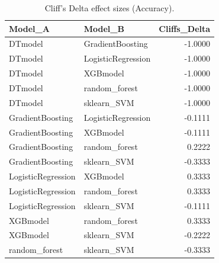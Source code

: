\begin{table}[t]
\centering
\begin{tabular}{llr}
\toprule
Model_A & Model_B & Cliffs_Delta \\
\midrule
DTmodel & GradientBoosting & -1.0000 \\
DTmodel & LogisticRegression & -1.0000 \\
DTmodel & XGBmodel & -1.0000 \\
DTmodel & random_forest & -1.0000 \\
DTmodel & sklearn_SVM & -1.0000 \\
GradientBoosting & LogisticRegression & -0.1111 \\
GradientBoosting & XGBmodel & -0.1111 \\
GradientBoosting & random_forest & 0.2222 \\
GradientBoosting & sklearn_SVM & -0.3333 \\
LogisticRegression & XGBmodel & 0.3333 \\
LogisticRegression & random_forest & 0.3333 \\
LogisticRegression & sklearn_SVM & -0.1111 \\
XGBmodel & random_forest & 0.3333 \\
XGBmodel & sklearn_SVM & -0.2222 \\
random_forest & sklearn_SVM & -0.3333 \\
\bottomrule
\end{tabular}
\caption{Cliff's Delta effect sizes (Accuracy).}
\label{tab:cliffs_Accuracy}
\end{table}